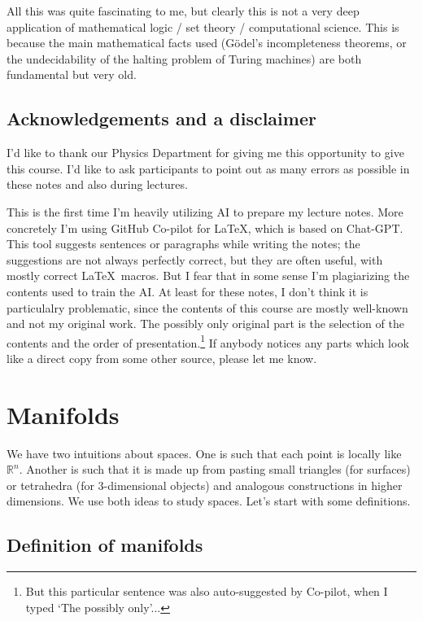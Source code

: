 \documentclass[12pt]{article}
\numberwithin{equation}{section}
\def\bR{\mathbb{R}}
\begin{document}
All this was quite fascinating to me, 
but clearly this is not a very deep application of mathematical logic / set theory / computational science.
This is because the main mathematical facts used (G\"odel's incompleteness theorems, or the undecidability of the halting problem of Turing machines) are both fundamental but very old.

\subsection{Acknowledgements and a disclaimer}

I'd like to thank our Physics Department for giving me this opportunity to give this course.
I'd like to ask participants to point out as many errors as possible in these notes and also during lectures.

This is the first time I'm heavily utilizing AI to prepare my lecture notes.
More concretely I'm using GitHub Co-pilot for \LaTeX, which is based on Chat-GPT.
This tool suggests sentences or paragraphs while writing the notes;
the suggestions are not always perfectly correct, but they are often useful,
with mostly correct \LaTeX\ macros.
But I fear that in some sense I'm plagiarizing the contents used to train the AI.
At least for these notes, I don't think it is particulalry problematic,
since the contents of this course are mostly well-known and not my original work.
The possibly only original part is the selection of the contents and the order of presentation.\footnote{%
But this particular sentence was also auto-suggested by Co-pilot, when I typed `The possibly only'...
}
If anybody notices any parts which look like a direct copy from some other source, please let me know.

\section{Manifolds}

We have two intuitions about spaces.
One is such that each point is locally like $\bR^n$.
Another is such that it is made up from pasting small triangles (for surfaces) or tetrahedra (for 3-dimensional objects) and analogous constructions in higher dimensions.
We use both ideas to study spaces. 
Let's start with some definitions.

\subsection{Definition of manifolds}
\end{document}
